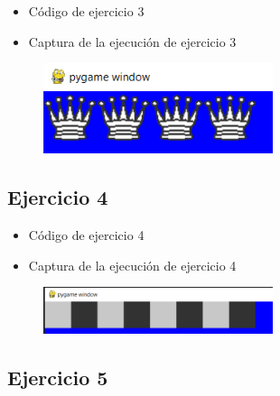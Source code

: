 \documentclass{article}
\begin{document}
	\begin{itemize}
		\item Código de ejercicio 3
	\end{itemize}
	
	\begin{itemize}
		\item Captura de la ejecución de ejercicio 3
	\end{itemize}
	\begin{figure}[H]
		\centering
		\includegraphics[width=0.6\textwidth,keepaspectratio]{imagenes/ejecucion3.png}
	\end{figure}
	\clearpage
	\subsection{Ejercicio 4}
	
	\begin{itemize}
		\item Código de ejercicio 4
	\end{itemize}
	
	\begin{itemize}
		\item Captura de la ejecución de ejercicio 4
	\end{itemize}
	\begin{figure}[H]
		\centering
		\includegraphics[width=0.6\textwidth,keepaspectratio]{imagenes/ejecucion4.png}
	\end{figure}
	\subsection{Ejercicio 5}
	
\end{document}
